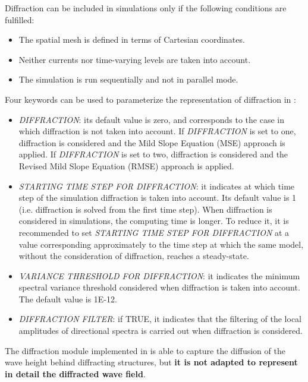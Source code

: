  Diffraction can be included in \tomawac simulations only if the following conditions are fulfilled:
\begin{itemize}

\item The spatial mesh is defined in terms of Cartesian coordinates.

 \item Neither currents nor time-varying levels are taken into account.

 \item The simulation is run sequentially and not in parallel mode.
\end{itemize}

Four keywords can be used to parameterize the representation of diffraction in \tomawac:

\begin{itemize}
\item  \textit{DIFFRACTION}: its default value is zero, and corresponds to the case in which diffraction is not taken into account. If \textit{DIFFRACTION} is set to one, diffraction is considered and the Mild Slope Equation (MSE) approach is applied. If \textit{DIFFRACTION} is set to two, diffraction is considered and the Revised Mild Slope Equation (RMSE) approach is applied.

\item  \textit{STARTING TIME STEP FOR DIFFRACTION}: it indicates at which time step of the simulation diffraction is taken into account. Its default value is 1 (i.e. diffraction is solved from the first time step). When diffraction is considered in \tomawac simulations, the computing time is longer. To reduce it, it is recommended to set \textit{STARTING TIME STEP FOR DIFFRACTION} at a value corresponding approximately to the time step at which the same \tomawac model, without the consideration of diffraction, reaches a steady-state.

\item  \textit{VARIANCE THRESHOLD FOR DIFFRACTION}: it indicates the minimum spectral variance threshold considered when diffraction is taken into account. The default value is 1E-12.

\item  \textit{DIFFRACTION FILTER}: if TRUE, it indicates that the filtering of the local amplitudes of directional spectra is carried out when diffraction is considered.
\end{itemize}

 The diffraction module implemented in \tomawac is able to capture the diffusion of the wave height behind diffracting structures, but \textbf{it is not adapted to represent in detail the diffracted wave field}.

